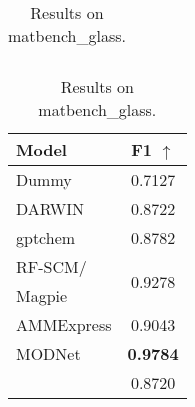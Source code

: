 \begin{table}[h]
\begin{minipage}{0.3\linewidth}
\begin{tabular}{lc}
    \bottomrule
    \end{tabular}
    \vspace{1cm} %
    \caption{Results on matbench\_is\_metal.}  
    \label{tab:pi-matbench-is-metal}
  \end{minipage}
  \hfill  
  \begin{minipage}{0.3\linewidth}
    \centering
    \begin{tabular}{lc}
    \toprule
    Model &  F1 $\uparrow$ \\
    \midrule
    Dummy\cite{matbench} & 0.7127 \\
    DARWIN\cite{xie2023darwin} & 0.8722 \\
    gptchem\cite{Jablonka_2023} & 0.8782\\
    RF-SCM/ & \multirow{2}{*}{0.9278}\\
    Magpie\cite{matbench} & \\
    AMMExpress\cite{matbench} & 0.9043\\
    MODNet\cite{De_Breuck_2021} & \textbf{0.9784}\\
    \midrule
    \ourM{} & 0.8720 \\
    \bottomrule
    \end{tabular}
    \vspace{1cm} %
    \caption{Results on matbench\_glass.}  
    \label{tab:pi-matbench-glass}
  \end{minipage}
\end{table}  






